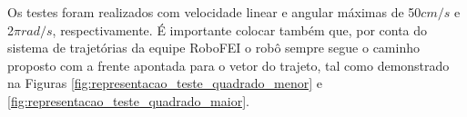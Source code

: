\documentclass[acronym, symbols, table, deposito]{fei}
\begin{document}
		Os testes foram realizados com velocidade linear e angular máximas de 50$cm/s$ e 2$\pi$$rad/s$, respectivamente. É importante colocar também que, por conta do sistema de trajetórias da equipe RoboFEI o robô sempre segue o caminho proposto com a frente apontada para o vetor do trajeto, tal como demonstrado na Figuras \ref{fig:representacao_teste_quadrado_menor} e \ref{fig:representacao_teste_quadrado_maior}.
		
%		
%		
%		
\end{document}
